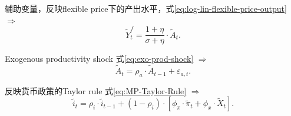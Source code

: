 辅助变量，反映flexible price下的产出水平，式\eqref{eq:log-lin-flexible-price-output} $\Rightarrow$
\begin{equation*}
  \tilde{Y}_t^f = \frac{1+\eta}{\sigma + \eta} \cdot \tilde{A}_t.
\end{equation*}

Exogenous productivity shock 式\eqref{eq:exo-prod-shock} $\Rightarrow$
\begin{equation*}
  \tilde{A}_t =\rho_a \cdot \tilde{A}_{t-1} + \varepsilon_{a,t}.
\end{equation*}

反映货币政策的Taylor rule 式\eqref{eq:MP-Taylor-Rule} $\Rightarrow$
\begin{equation*}
  \tilde{i}_t = \rho_i \cdot \tilde{i}_{t-1} + (1-\rho_i) \cdot \left[\phi_{\pi} \cdot \tilde{\pi}_t + \phi_{x} \cdot \tilde{X}_t \right].
\end{equation*}

